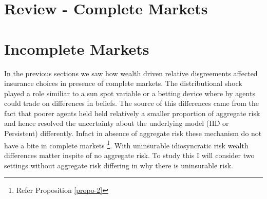\documentclass[12pt]{article}
\begin{document}
%
%
%
\section{Review - Complete Markets}

\section{Incomplete Markets}
In the previous sections we saw how wealth driven relative disgreements affected insurance choices in presence of complete markets. The distributional shock played a role similiar to a sun spot variable or a betting device where by agents could trade on differences in beliefs. The source of this differences came from the fact that poorer agents held held relatively a smaller proportion of aggregate risk and hence resolved the uncertainty about the underlying model (IID or Persistent) differently. Infact in absence of aggregate risk these mechanism do not have a bite in complete markets \footnote{Refer Proposition \ref{propo-2}}. With uninsurable idiosyncratic risk wealth differences matter inspite of no aggregate risk. To study this I will consider two settings without aggregate risk differing in why there is uninsurable risk. 
\end{document}
